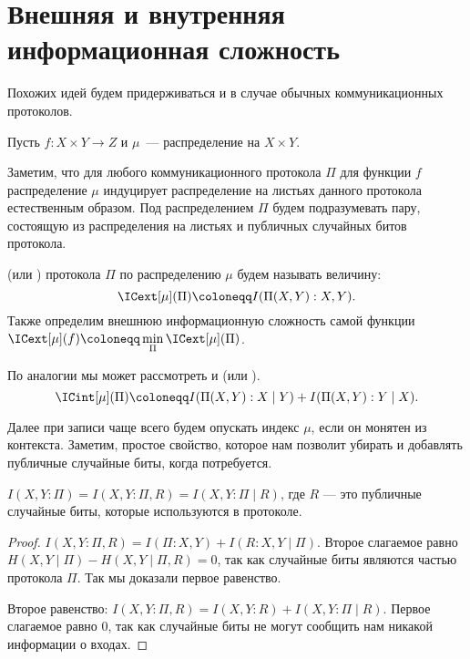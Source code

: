 \section{Внешняя и внутренняя информационная сложность}

Похожих идей будем придерживаться и в случае обычных коммуникационных протоколов.

\begin{definition}
    Пусть $f\colon X \times Y \to Z$ и $\mu$~--- распределение на $X \times Y$.

    Заметим, что для любого коммуникационного протокола $\Pi$ для функции $f$ распределение $\mu$
    индуцирует распределение на листьях данного протокола естественным образом. Под распределением $\Pi$
    будем подразумевать пару, состоящую из распределения на листьях и публичных случайных битов протокола.
    
     (или )
    протокола $\Pi$ по распределению $\mu$ будем называть величину:
    $$
        \ICext[\mu](\Pi) \coloneqq I(\Pi(X, Y) : X, Y).
    $$
    Также определим внешнюю информационную сложность самой функции
    $\ICext[\mu](f) \coloneqq \min\limits_{\Pi} \ICext[\mu](\Pi)$.

    По аналогии мы может рассмотреть и  (или 
    ).
    $$
        \ICint[\mu](\Pi) \coloneqq I(\Pi(X, Y) : X \mid Y) + I(\Pi(X, Y) : Y \mid X).
    $$
\end{definition}

Далее при записи чаще всего будем опускать индекс $\mu$, если он монятен из контекста. Заметим, простое
свойство, которое нам позволит убирать и добавлять публичные случайные биты, когда потребуется.

\begin{theorem}
    $I(X, Y : \Pi) = I(X, Y : \Pi, R) = I(X, Y : \Pi \mid R)$, где $R$ --- это публичные случайные биты,
    которые используются в протоколе.
\end{theorem}

\begin{proof}
    $I(X, Y : \Pi, R) = I(\Pi : X, Y) + I(R : X, Y \mid \Pi)$. Второе слагаемое равно $H(X, Y \mid \Pi) -
    H(X, Y \mid \Pi, R) = 0$, так как случайные биты являются частью протокола $\Pi$. Так мы доказали
    первое равенство.

    Второе равенство: $I(X, Y : \Pi, R) = I(X, Y : R) + I(X, Y : \Pi \mid R)$. Первое слагаемое равно
    $0$, так как случайные биты не могут сообщить нам никакой информации о входах.
\end{proof}


